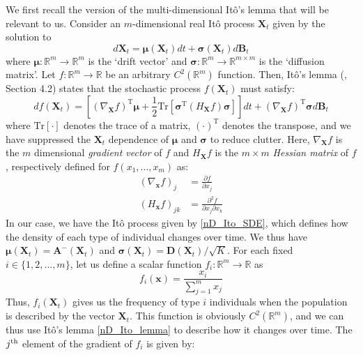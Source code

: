 We first recall the version of the multi-dimensional It\^{o}'s lemma that will be relevant to us. Consider an $m$-dimensional real It\^{o} process $\mathbf{X}_t$ given by the solution to
\begin{equation*}
d\mathbf{X}_t = \boldsymbol{\mu}(\mathbf{X}_t)dt + \boldsymbol{\sigma}(\mathbf{X}_t)d\mathbf{B}_t
\end{equation*}
where $\boldsymbol{\mu}: \mathbb{R}^m \to \mathbb{R}^m$ is the `drift vector' and $\boldsymbol{\sigma}: \mathbb{R}^{m} \to \mathbb{R}^{m \times m}$ is the `diffusion matrix'. Let $f: \mathbb{R}^m \to \mathbb{R}$ be an arbitrary $C^2(\mathbb{R}^m)$ function. Then, It\^{o}'s lemma (\cite{oksendal_stochastic_1998}, Section 4.2) states that  the stochastic process $f(\mathbf{X}_t)$ must satisfy:
\begin{equation}
\label{nD_Ito_lemma}
df(\mathbf{X}_t) = \left[\left(\nabla_{\mathbf{X}}f\right)^{\mathrm{T}}\boldsymbol{\mu} + \frac{1}{2}\mathrm{Tr}[\boldsymbol{\sigma}^{\mathrm{T}}(H_{\mathbf{X}}f)\boldsymbol{\sigma}]\right]dt + \left(\nabla_{\mathbf{X}}f\right)^{\mathrm{T}}\boldsymbol{\sigma}d\mathbf{B}_t
\end{equation}
where $\mathrm{Tr}[\cdot]$ denotes the trace of a matrix, $\left(\cdot\right)^{\mathrm{T}}$ denotes the transpose, and we have suppressed the $\mathbf{X}_t$ dependence of $\boldsymbol{\mu}$ and $\boldsymbol{\sigma}$ to reduce clutter. Here, $\nabla_{\mathbf{X}}f$ is the $m$ dimensional \emph{gradient vector} of $f$ and $H_{\mathbf{X}}f$ is the $m \times m$ \emph{Hessian matrix} of $f$, respectively defined for $f(x_1,\ldots,x_m)$ as:
\begin{align*}
\left(\nabla_{\mathbf{x}} f\right)_j &= \frac{\partial f}{\partial x_j}\\
\left(H_{\mathbf{x}} f\right)_{jk} &= \frac{\partial^2 f}{\partial x_j \partial x_k } 
\end{align*}
In our case, we have the It\^{o} process given by \eqref{nD_Ito_SDE}, which defines how the density of each type of individual changes over time. We thus have $\boldsymbol{\mu}(\mathbf{X}_t) = \mathbf{A}^{-}(\mathbf{X}_t)$ and $\boldsymbol{\sigma}(\mathbf{X}_t) = \mathbf{D}(\mathbf{X}_t)/\sqrt{K}$.  For each fixed $i \in \{1,2,\ldots,m\}$, let us define a scalar function $f_i: \mathbb{R}^m \to \mathbb{R}$ as
\begin{equation*}
f_i(\mathbf{x}) = \frac{x_i}{\sum\limits_{j=1}^{m}x_j}
\end{equation*}
Thus, $f_i(\mathbf{X}_t)$ gives us the frequency of type $i$ individuals when the population is described by the vector $\mathbf{X}_t$. This function is obviously $C^2(\mathbb{R}^m)$, and we can thus use It\^{o}'s lemma \eqref{nD_Ito_lemma} to describe how it changes over time. The $j\textsuperscript{th}$ element of the gradient of $f_i$ is given by:
